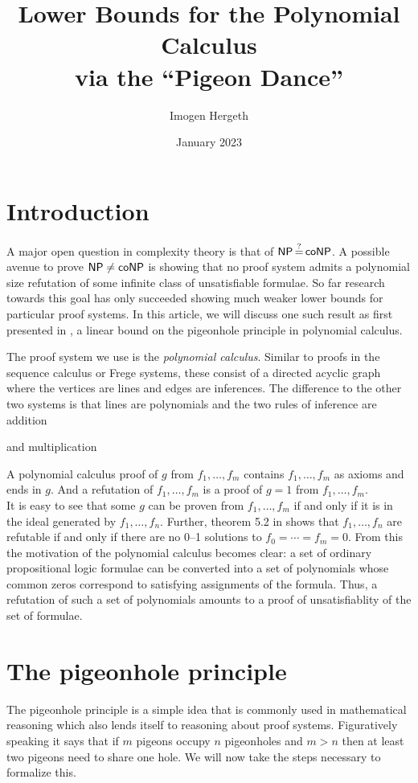 \documentclass{article}
\title{Lower Bounds for the Polynomial Calculus\\via the ``Pigeon Dance''}
\author{Imogen Hergeth}
\date{January 2023}
\begin{document}
\maketitle

\section{Introduction}
A major open question in complexity theory is that of $\NP \queq \co\NP$. A possible avenue to prove $\NP \neq \co\NP$ is
showing that no proof system admits a polynomial size refutation of some infinite class of unsatisfiable formulae.
So far research towards this goal has only succeeded showing much weaker lower bounds for particular proof systems.
In this article, we will discuss one such result as first presented in \cite{raz},
a linear bound on the pigeonhole principle in polynomial calculus.

The proof system we use is the \textit{polynomial calculus}. Similar to proofs in the sequence calculus or Frege systems, these consist of a directed acyclic graph where the vertices are lines and edges are inferences. The difference to the other two systems is that lines are polynomials and the two rules of inference are addition
\begin{prooftree}
\end{prooftree}
and multiplication
\begin{prooftree}
\end{prooftree}
A polynomial calculus proof of $g$ from $f_1, \ldots, f_m$ contains $f_1, \ldots, f_m$ as axioms and ends in $g$. And a refutation of $f_1, \ldots, f_m$ is a proof of $g = 1$ from $f_1, \ldots, f_m$.\\
It is easy to see that some $g$ can be proven from $f_1, \ldots, f_m$ if and only if it is in the ideal generated by $f_1, \ldots, f_n$. Further, theorem 5.2 in \cite{buss} shows that $f_1, \ldots, f_n$ are refutable if and only if there are no 0--1 solutions to $f_0 = \cdots = f_m = 0$. From this the motivation of the polynomial calculus becomes clear: a set of ordinary propositional logic formulae can be converted into a set of polynomials whose common zeros correspond to satisfying assignments of the formula. Thus, a refutation of such a set of polynomials amounts to a proof of unsatisfiablity of the set of formulae.


\section{The pigeonhole principle}
The pigeonhole principle is a simple idea that is commonly used in mathematical reasoning which also lends itself to reasoning about proof systems. Figuratively speaking it says that if $m$ pigeons occupy $n$ pigeonholes and $m > n$ then at least two pigeons need to share one hole. We will now take the steps necessary to formalize this.
\end{document}
